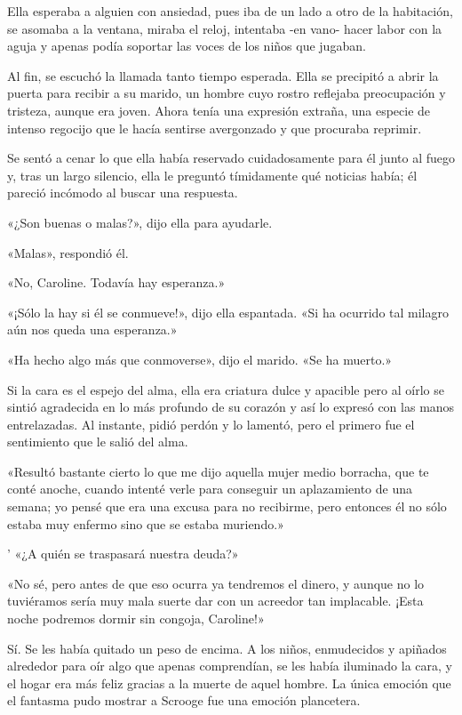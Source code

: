 \documentclass{novela}
\begin{document}
 Ella esperaba a alguien con ansiedad, pues iba de un lado a otro de la habitación, se asomaba a la ventana, miraba el reloj, intentaba -en vano- hacer labor con la aguja y apenas podía soportar las voces de los niños que jugaban.

 Al fin, se escuchó la llamada tanto tiempo esperada. Ella se precipitó a abrir la puerta para recibir a su marido, un hombre cuyo rostro reflejaba preocupación y tristeza, aunque era joven. Ahora tenía una expresión extraña, una especie de intenso regocijo que le hacía sentirse avergonzado y que procuraba reprimir.

 Se sentó a cenar lo que ella había reservado cuidadosamente para él junto al fuego y, tras un largo silencio, ella le preguntó tímidamente qué noticias había; él pareció incómodo al buscar una respuesta.

 «¿Son buenas o malas?», dijo ella para ayudarle.

 «Malas», respondió él.

 «No, Caroline. Todavía hay esperanza.»

 «¡Sólo la hay si él se conmueve!», dijo ella espantada. «Si ha ocurrido tal milagro aún nos queda una esperanza.»

 «Ha hecho algo más que conmoverse», dijo el marido. «Se ha muerto.»

 Si la cara es el espejo del alma, ella era criatura dulce y apacible pero al oírlo se sintió agradecida en lo más profundo de su corazón y así lo expresó con las manos entrelazadas. Al instante, pidió perdón y lo lamentó, pero el primero fue el sentimiento que le salió del alma.

 «Resultó bastante cierto lo que me dijo aquella mujer medio borracha, que te conté anoche, cuando intenté verle para conseguir un aplazamiento de una semana; yo pensé que era una excusa para no recibirme, pero entonces él no sólo estaba muy enfermo sino que se estaba muriendo.»

 ' «¿A quién se traspasará nuestra deuda?»

 «No sé, pero antes de que eso ocurra ya tendremos el dinero, y aunque no lo tuviéramos sería muy mala suerte dar con un acreedor tan implacable. ¡Esta noche podremos dormir sin congoja, Caroline!»

 Sí. Se les había quitado un peso de encima. A los niños, enmudecidos y apiñados alrededor para oír algo que apenas comprendían, se les había iluminado la cara, y el hogar era más feliz gracias a la muerte de aquel hombre. La única emoción que el fantasma pudo mostrar a Scrooge fue una emoción plancetera.
\end{document}
